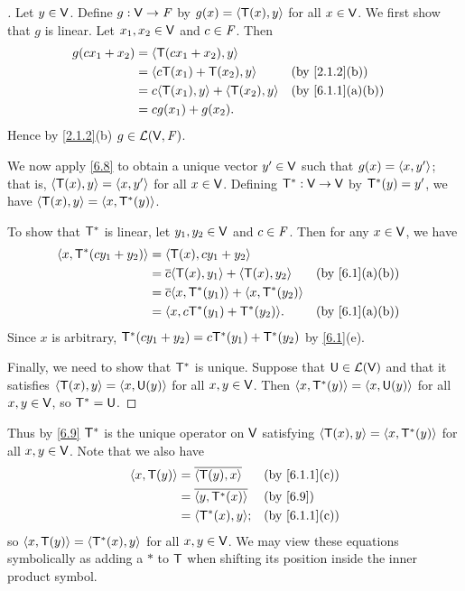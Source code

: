 \begin{proof}[]
  Let \(y \in \mathsf{V}\).
  Define \(g : \mathsf{V} \to \mathit{F}\) by \(g(x) = \left\langle\mathsf{T}(x), y\right\rangle\) for all \(x \in \mathsf{V}\).
  We first show that \(g\) is linear.
  Let \(x_1, x_2 \in \mathsf{V}\) and \(c \in \mathit{F}\).
  Then
  \begin{align*}
    g(c x_1 + x_2) & = \inn{\T(c x_1 + x_2), y}                                   \\
                   & = \inn{c \T(x_1) + \T(x_2), y}          &  & \by{2.1.2}[b]   \\
                   & = c \inn{\T(x_1), y} + \inn{\T(x_2), y} &  & \by{6.1.1}[a,b] \\
                   & = c g(x_1) + g(x_2).
  \end{align*}
  Hence by \cref{2.1.2}(b) \(g \in \mathcal{L}(\mathsf{V}, \mathit{F})\).

  We now apply \cref{6.8} to obtain a unique vector \(y' \in \mathsf{V}\) such that \(g(x) = \left\langle x, y'\right\rangle\);
  that is, \(\left\langle\mathsf{T}(x), y\right\rangle = \left\langle x, y'\right\rangle\) for all \(x \in \mathsf{V}\).
  Defining \(\mathsf{T}^* : \mathsf{V} \to \mathsf{V}\) by \(\mathsf{T}^*(y) = y'\), we have \(\left\langle\mathsf{T}(x), y\right\rangle = \left\langle x, \mathsf{T}^*(y)\right\rangle\).

  To show that \(\mathsf{T}^*\) is linear, let \(y_1, y_2 \in \mathsf{V}\) and \(c \in \mathit{F}\).
  Then for any \(x \in \mathsf{V}\),
  we have
  \begin{align*}
    \inn{x, \T^*(c y_1 + y_2)} & = \inn{\T(x), c y_1 + y_2}                                            \\
                               & = \conj{c} \inn{\T(x), y_1} + \inn{\T(x), y_2}     &  & \by{6.1}[a,b] \\
                               & = \conj{c} \inn{x, \T^*(y_1)} + \inn{x, \T^*(y_2)}                    \\
                               & = \inn{x, c \T^*(y_1) + \T^*(y_2)}.                &  & \by{6.1}[a,b]
  \end{align*}
  Since \(x\) is arbitrary, \(\mathsf{T}^*(c y_1 + y_2) = c \mathsf{T}^*(y_1) + \mathsf{T}^*(y_2)\) by \cref{6.1}(e).

  Finally, we need to show that \(\mathsf{T}^*\) is unique. Suppose that \(\mathsf{U} \in \mathcal{L}(\mathsf{V})\) and that it satisfies \(\left\langle\mathsf{T}(x), y\right\rangle = \left\langle x, \mathsf{U}(y)\right\rangle\) for all \(x, y \in \mathsf{V}\).
  Then \(\left\langle x, \mathsf{T}^*(y)\right\rangle = \left\langle x, \mathsf{U}(y)\right\rangle\) for all \(x, y \in \mathsf{V}\), so \(\mathsf{T}^* = \mathsf{U}\).
\end{proof}

\begin{note}
  Thus by \cref{6.9} \(\mathsf{T}^*\) is the unique operator on \(\mathsf{V}\) satisfying \(\left\langle\mathsf{T}(x), y\right\rangle = \left\langle x, \mathsf{T}^*(y)\right\rangle\) for all \(x, y \in \mathsf{V}\).
  Note that we also have
  \begin{align*}
    \inn{x, \T(y)} & = \conj{\inn{\T(y), x}}   &  & \by{6.1.1}[c] \\
                   & = \conj{\inn{y, \T^*(x)}} &  & \by{6.9}      \\
                   & = \inn{\T^*(x), y};       &  & \by{6.1.1}[c]
  \end{align*}
  so \(\left\langle x, \mathsf{T}(y)\right\rangle = \left\langle\mathsf{T}^*(x), y\right\rangle\) for all \(x, y \in \mathsf{V}\).
  We may view these equations symbolically as adding a \(*\) to \(\mathsf{T}\) when shifting its position inside the inner product symbol.
\end{note}

